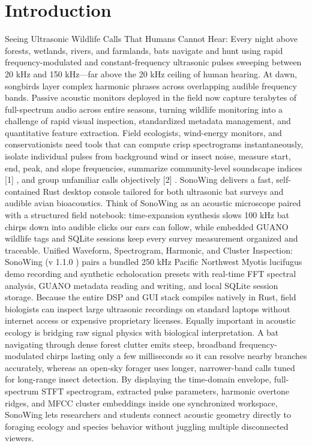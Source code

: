 \documentclass[10pt,letterpaper]{article}
\begin{document}
\section{Introduction}
Seeing Ultrasonic Wildlife Calls That Humans Cannot Hear: Every night above forests, wetlands, rivers, and farmlands, bats navigate and hunt using rapid frequency-modulated and constant-frequency ultrasonic pulses sweeping between 20 kHz and 150 kHz---far above the 20 kHz ceiling of human hearing. At dawn, songbirds layer complex harmonic phrases across overlapping audible frequency bands. Passive acoustic monitors deployed in the field now capture terabytes of full-spectrum audio across entire seasons, turning wildlife monitoring into a challenge of rapid visual inspection, standardized metadata management, and quantitative feature extraction. Field ecologists, wind-energy monitors, and conservationists need tools that can compute crisp spectrograms instantaneously, isolate individual pulses from background wind or insect noise, measure start, end, peak, and slope frequencies, summarize community-level soundscape indices [1] , and group unfamiliar calls objectively [2] . SonoWing delivers a fast, self-contained Rust desktop console tailored for both ultrasonic bat surveys and audible avian bioacoustics. Think of SonoWing as an acoustic microscope paired with a structured field notebook: time-expansion synthesis slows 100 kHz bat chirps down into audible clicks our ears can follow, while embedded GUANO wildlife tags and SQLite sessions keep every survey measurement organized and traceable. Unified Waveform, Spectrogram, Harmonic, and Cluster Inspection: SonoWing (v 1.1.0 ) pairs a bundled 250 kHz Pacific Northwest Myotis lucifugus demo recording and synthetic echolocation presets with real-time FFT spectral analysis, GUANO metadata reading and writing, and local SQLite session storage. Because the entire DSP and GUI stack compiles natively in Rust, field biologists can inspect large ultrasonic recordings on standard laptops without internet access or expensive proprietary licenses. Equally important in acoustic ecology is bridging raw signal physics with biological interpretation. A bat navigating through dense forest clutter emits steep, broadband frequency-modulated chirps lasting only a few milliseconds so it can resolve nearby branches accurately, whereas an open-sky forager uses longer, narrower-band calls tuned for long-range insect detection. By displaying the time-domain envelope, full-spectrum STFT spectrogram, extracted pulse parameters, harmonic overtone ridges, and MFCC cluster embeddings inside one synchronized workspace, SonoWing lets researchers and students connect acoustic geometry directly to foraging ecology and species behavior without juggling multiple disconnected viewers.
\end{document}
